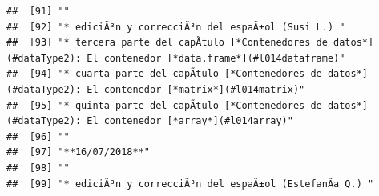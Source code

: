 \documentclass[
]{book}
\begin{document}
\begin{verbatim}
##  [91] ""                                                                                                                                                                                                                                                                                                        
##  [92] "* ediciÃ³n y correcciÃ³n del espaÃ±ol (Susi L.) "                                                                                                                                                                                                                                                        
##  [93] "* tercera parte del capÃ­tulo [*Contenedores de datos*](#dataType2): El contenedor [*data.frame*](#l014dataframe)"                                                                                                                                                                                       
##  [94] "* cuarta parte del capÃ­tulo [*Contenedores de datos*](#dataType2): El contenedor [*matrix*](#l014matrix)"                                                                                                                                                                                               
##  [95] "* quinta parte del capÃ­tulo [*Contenedores de datos*](#dataType2): El contenedor [*array*](#l014array)"                                                                                                                                                                                                 
##  [96] ""                                                                                                                                                                                                                                                                                                        
##  [97] "**16/07/2018**"                                                                                                                                                                                                                                                                                          
##  [98] ""                                                                                                                                                                                                                                                                                                        
##  [99] "* ediciÃ³n y correcciÃ³n del espaÃ±ol (EstefanÃ­a Q.) "                                                                                                                                                                                                                                                  

\end{verbatim}
\end{document}
